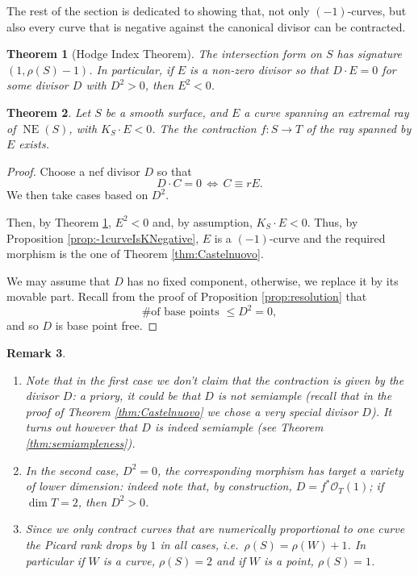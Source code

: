 \documentclass[a4paper,11pt]{amsart}
\newtheorem{theorem}{Theorem}[section]
\newtheorem{remark}[theorem]{Remark}
\def\dim{\operatorname{dim}}
\def\NE{\operatorname{NE}}
\newcommand{\OO}{\mathcal{O}}
\begin{document}
The rest of the section is dedicated to showing that, not only $(-1)$-curves, but also every curve that is negative against the canonical divisor can be contracted.


\begin{theorem}[{Hodge Index Theorem}]\label{thm:Hodge}
	The intersection form on $S$ has signature $\left(1,\rho(S) - 1\right)$.	
	In particular, if $E$ is a non-zero divisor so that $D\cdot E =0$ for some divisor $D$ with $D^2 >0$, then $E^2 < 0$.
\end{theorem}

\begin{theorem}\label{thm:contrK-neg}
	Let $S$ be a smooth surface, and $E$ a curve spanning an extremal ray of $\NE(S)$, with $K_S\cdot E <0$.
	The the contraction $f\colon S \to T$ of the ray spanned by $E$ exists.
\end{theorem}

\begin{proof}
	Choose a nef divisor $D$ so that 
	\[
	D\cdot C = 0 \, \iff \, C \equiv rE.
	\]
	We then take cases based on $D^2$.
	
	\noindent{}
	
	Then, by Theorem \ref{thm:Hodge}, $E^2<0$ and, by assumption, $K_S\cdot E<0$.
	Thus, by Proposition \ref{prop:-1curveIsKNegative}, $E$ is a $(-1)$-curve and the required morphism is the one of Theorem \ref{thm:Castelnuovo}.
	
	\noindent{}
	
	We may assume that $D$ has no fixed component, otherwise, we replace it by its movable part.
	Recall from the proof of Proposition \ref{prop:resolution} that
	\[
	\text{\# of base points } \leq D^2 = 0,
	\]
	and so $D$ is base point free.
\end{proof}

\begin{remark}\leavevmode \label{rem:contractions}
	\begin{enumerate}
		\item Note that in the first case we don't claim that the contraction is given by the divisor $D$:
		a priory, it could be that $D$ is not semiample (recall that in the proof of Theorem \ref{thm:Castelnuovo} we chose a very special divisor $D$).
		It turns out however that $D$ is indeed semiample (see Theorem \ref{thm:semiampleness}).
		\item\label{it:cotractions1} In the second case, $D^2 = 0$, the corresponding morphism has target a variety of lower dimension:
		indeed note that, by construction, $D = f^*\OO_{T}(1)$;
		if $\dim T = 2$, then $D^2>0$.
		\item\label{it:cotractions2} Since we only contract curves that are numerically proportional to one curve the Picard rank drops by $1$ in all cases, i.e.\ $\rho(S) = \rho(W) +1$.
		In particular if $W$ is a curve, $\rho(S) = 2$ and if $W$ is a point, $\rho(S)=1$.
	\end{enumerate}
\end{remark}
\end{document}
